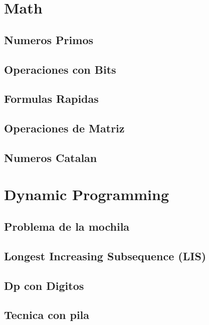 \section{Math}
\subsection{Numeros Primos}
\raggedbottom
\hrulefill
\subsection{Operaciones con Bits}
\raggedbottom
\hrulefill
\subsection{Formulas Rapidas}
\raggedbottom
\hrulefill
\subsection{Operaciones de Matriz}
\raggedbottom
\hrulefill
\subsection{Numeros Catalan}
\raggedbottom
\hrulefill

\section{Dynamic Programming}
\subsection{Problema de la mochila}
\raggedbottom
\hrulefill
\subsection{Longest Increasing Subsequence (LIS)}
\raggedbottom
\hrulefill
\subsection{Dp con Digitos}
\raggedbottom
\hrulefill
\subsection{Tecnica con pila}
\raggedbottom
\hrulefill

